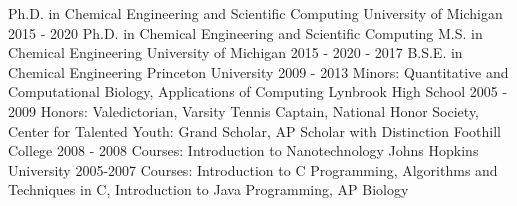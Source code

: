 \begin{cventries}
  \ifcompact
  \cventry
    {Ph.D. in Chemical Engineering and Scientific Computing} %
    {University of Michigan} %
    {} %
    {2015 - 2020} %
    {
    }
  \else
  \cventry
    {Ph.D. in Chemical Engineering and Scientific Computing \linebreak M.S. in Chemical Engineering} %
    {University of Michigan} %
    {} %
    {2015 - 2020  - 2017} %
    {
    }
  \fi
  \cventry
    {B.S.E. in Chemical Engineering} %
    {Princeton University} %
    {} %
    {2009 - 2013} %
    {\scriptsize Minors: Quantitative and Computational Biology, Applications of Computing
    }
\ifoutdated
  \cventry
    {} %
    {Lynbrook High School} %
    {} %
    {2005 - 2009} %
    {\scriptsize Honors: Valedictorian, Varsity Tennis Captain, National Honor Society, Center for Talented Youth: Grand Scholar, AP Scholar with Distinction
    }
  \cventry
    {} %
    {Foothill College} %
    {} %
    {2008 - 2008} %
    {\scriptsize Courses: Introduction to Nanotechnology
    }
  \cventry
    {} %
    {Johns Hopkins University} %
    {} %
    {2005-2007} %
    {\scriptsize Courses: Introduction to C Programming, Algorithms and Techniques in C, Introduction to Java Programming, AP Biology
    }
\fi
\end{cventries}
